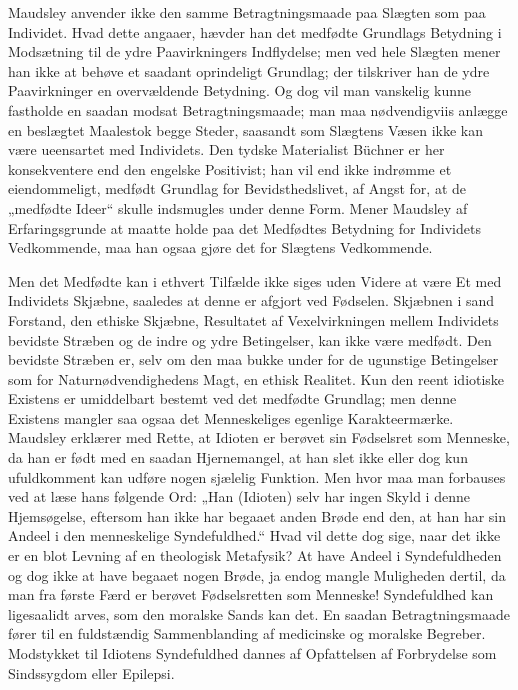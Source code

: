 \documentclass[12pt,a4paper,openany]{book}
\newcommand{\opage}[1]{\marginnote{\footnotesize\textit{[#1]}}}
\begin{document}
Maudsley anvender ikke den samme Betragtningsmaade
paa Slægten som paa Individet. Hvad dette angaaer, hævder
han det medfødte Grundlags Betydning i Modsætning til de
ydre Paavirkningers Indflydelse; men ved hele Slægten mener
han ikke at behøve et saadant oprindeligt Grundlag; der tilskriver
han de ydre Paavirkninger en overvældende Betydning.
Og dog vil man vanskelig kunne fastholde en saadan modsat
Betragtningsmaade; man maa nødvendigviis anlægge en
beslægtet Maalestok begge Steder, saasandt som Slægtens
Væsen ikke kan være ueensartet med Individets. Den tydske
Materialist Büchner er her konsekventere end den engelske
Positivist; han vil end ikke indrømme et eiendommeligt, medfødt
Grundlag for Bevidsthedslivet, af Angst for, at de
„medfødte Ideer“ skulle indsmugles under denne Form. Mener
Maudsley af Erfaringsgrunde at maatte holde paa det Medfødtes
Betydning for Individets Vedkommende, maa han
ogsaa gjøre det for Slægtens Vedkommende.

Men det Medfødte kan i ethvert Tilfælde ikke siges uden
Videre at være Et med Individets Skjæbne, saaledes at
denne er afgjort ved Fødselen. Skjæbnen i sand Forstand,
den ethiske Skjæbne, Resultatet af Vexelvirkningen mellem
Individets bevidste Stræben og de indre og ydre Betingelser,
kan ikke være medfødt. Den bevidste Stræben er, selv om
\opage{331}den maa bukke under for de ugunstige Betingelser som for
Naturnødvendighedens Magt, en ethisk Realitet. Kun den reent
idiotiske Existens er umiddelbart bestemt ved det medfødte
Grundlag; men denne Existens mangler saa ogsaa det Menneskeliges
egenlige Karakteermærke. Maudsley erklærer med
Rette, at Idioten er berøvet sin Fødselsret som Menneske,
da han er født med en saadan Hjernemangel, at han slet
ikke eller dog kun ufuldkomment kan udføre nogen sjælelig
Funktion. Men hvor maa man forbauses ved at læse hans
følgende Ord: „Han (Idioten) selv har ingen Skyld i
denne Hjemsøgelse, eftersom han ikke har begaaet anden
Brøde end den, at han har sin Andeel i den menneskelige
Syndefuldhed.“ Hvad vil dette dog sige, naar det ikke er
en blot Levning af en theologisk Metafysik? At have Andeel
i Syndefuldheden og dog ikke at have begaaet nogen Brøde,
ja endog mangle Muligheden dertil, da man fra første Færd
er berøvet Fødselsretten som Menneske! Syndefuldhed kan
ligesaalidt arves, som den moralske Sands kan det. En
saadan Betragtningsmaade fører til en fuldstændig Sammenblanding
af medicinske og moralske Begreber. Modstykket
til Idiotens Syndefuldhed dannes af Opfattelsen af Forbrydelse
som Sindssygdom eller Epilepsi.
\end{document}
